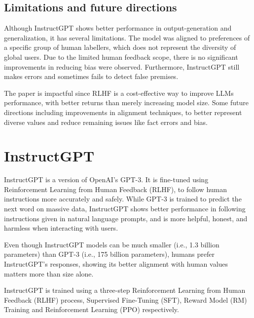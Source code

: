 \documentclass{article} %
\begin{document}
\subsection{Limitations and future directions}
Although InstructGPT shows better performance in output-generation and generalization, it has several limitations. The model was aligned to preferences of a specific group of human labellers, which does not represent the diversity of global users. Due to the limited human feedback scope, there is no significant improvements in reducing bias were observed. Furthermore, InstructGPT still makes errors and sometimes fails to detect false premises.

The paper is impactful since RLHF is a cost-effective way to improve LLMs performance, with better returns than merely increasing model size. Some future directions including improvements in alignment techniques, to better represent diverse values and reduce remaining issues like fact errors and bias.


\section{InstructGPT}
InstructGPT is a version of OpenAI’s GPT-3. It is fine-tuned using Reinforcement Learning from Human Feedback (RLHF), to follow human instructions more accurately and safely. While GPT-3 is trained to predict the next word on massive data, InstructGPT shows better performance in following instructions given in natural language prompts, and is more helpful, honest, and harmless when interacting with users. 

Even though InstructGPT models can be much smaller (i.e., 1.3 billion parameters) than GPT-3 (i.e., 175 billion parameters), humans prefer InstructGPT's responses, showing its better alignment with human values matters more than size alone.

InstructGPT is trained using a three-step Reinforcement Learning from Human Feedback (RLHF) process, Supervised Fine-Tuning (SFT), Reward Model (RM) Training and Reinforcement Learning (PPO) respectively. 
\end{document}
